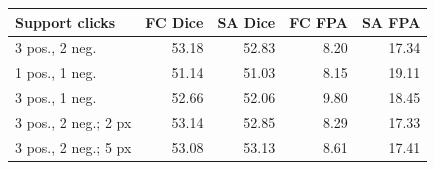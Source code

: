 \par\medskip\noindent\begin{minipage}{\linewidth}
\captionsetup{type=table}
\centering
\caption{Support-click sensitivity on 330 fixed tasks. FC denotes FewClick and SA denotes SANSA. Dice and absent-target FPA are percentages. The final two rows apply radial click perturbations in $512\times512$ support coordinates.}
\label{tab:prompts}
\small
\setlength{\tabcolsep}{4pt}
\begin{tabular}{@{}lrrrr@{}}
\toprule
Support clicks & FC Dice & SA Dice & FC FPA & SA FPA \\
\midrule
3 pos., 2 neg. & 53.18 & 52.83 & 8.20 & 17.34 \\
1 pos., 1 neg. & 51.14 & 51.03 & 8.15 & 19.11 \\
3 pos., 1 neg. & 52.66 & 52.06 & 9.80 & 18.45 \\
3 pos., 2 neg.; 2 px & 53.14 & 52.85 & 8.29 & 17.33 \\
3 pos., 2 neg.; 5 px & 53.08 & 53.13 & 8.61 & 17.41 \\
\bottomrule
\end{tabular}
\end{minipage}\par\medskip
